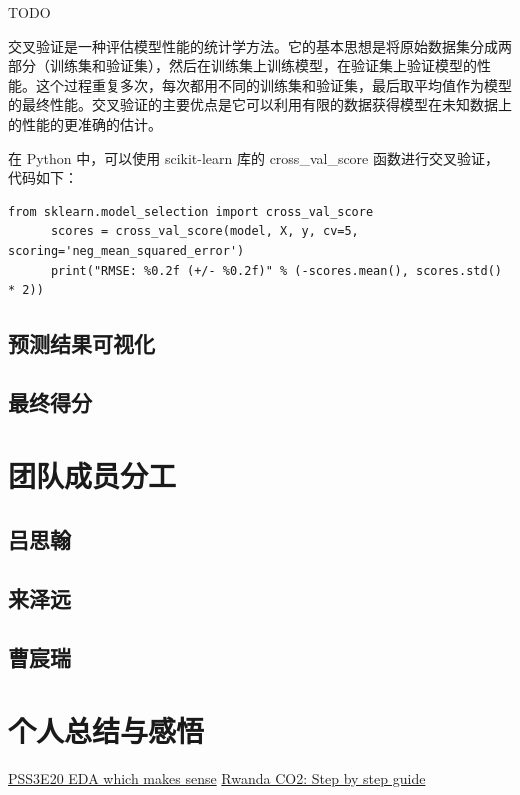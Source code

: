 \documentclass[fontset=windows]{article}
\begin{document}
TODO

交叉验证是一种评估模型性能的统计学方法。它的基本思想是将原始数据集分成两部分（训练集和验证集），然后在训练集上训练模型，在验证集上验证模型的性能。这个过程重复多次，每次都用不同的训练集和验证集，最后取平均值作为模型的最终性能。交叉验证的主要优点是它可以利用有限的数据获得模型在未知数据上的性能的更准确的估计。

在 Python 中，可以使用 scikit-learn 库的 cross\_val\_score 函数进行交叉验证，代码如下：

\begin{lstlisting}[style=Python]
      from sklearn.model_selection import cross_val_score
      scores = cross_val_score(model, X, y, cv=5, scoring='neg_mean_squared_error')
      print("RMSE: %0.2f (+/- %0.2f)" % (-scores.mean(), scores.std() * 2))
\end{lstlisting}

\subsection{预测结果可视化}

\subsection{最终得分}



\section{团队成员分工}

\subsection{吕思翰}

\subsection{来泽远}

\subsection{曹宸瑞}

\section{个人总结与感悟}

\begin{thebibliography}{100}  
\href{https://www.kaggle.com/code/ambrosm/pss3e20-eda-which-makes-sense}{PSS3E20 EDA which makes sense}
\href{https://www.kaggle.com/code/kacperrabczewski/rwanda-co2-step-by-step-guide}{Rwanda CO2: Step by step guide}
\end{thebibliography}
\end{document}
